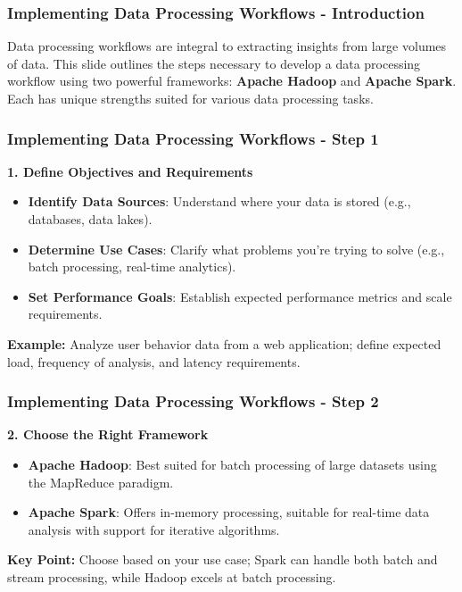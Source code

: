 \documentclass[aspectratio=169]{beamer}
\begin{document}
\begin{frame}[fragile]
    \frametitle{Implementing Data Processing Workflows - Introduction}
    Data processing workflows are integral to extracting insights from large volumes of data. 
    This slide outlines the steps necessary to develop a data processing workflow using two powerful frameworks: 
    \textbf{Apache Hadoop} and \textbf{Apache Spark}. Each has unique strengths suited for various data processing tasks.
\end{frame}

\begin{frame}[fragile]
    \frametitle{Implementing Data Processing Workflows - Step 1}
    \textbf{1. Define Objectives and Requirements}
    \begin{itemize}
        \item \textbf{Identify Data Sources}: Understand where your data is stored (e.g., databases, data lakes).
        \item \textbf{Determine Use Cases}: Clarify what problems you’re trying to solve (e.g., batch processing, real-time analytics).
        \item \textbf{Set Performance Goals}: Establish expected performance metrics and scale requirements.
    \end{itemize}
    \textbf{Example:} Analyze user behavior data from a web application; define expected load, frequency of analysis, and latency requirements.
\end{frame}

\begin{frame}[fragile]
    \frametitle{Implementing Data Processing Workflows - Step 2}
    \textbf{2. Choose the Right Framework}
    \begin{itemize}
        \item \textbf{Apache Hadoop}: Best suited for batch processing of large datasets using the MapReduce paradigm.
        \item \textbf{Apache Spark}: Offers in-memory processing, suitable for real-time data analysis with support for iterative algorithms.
    \end{itemize}
    \textbf{Key Point:} Choose based on your use case; Spark can handle both batch and stream processing, while Hadoop excels at batch processing.
\end{frame}
\end{document}
